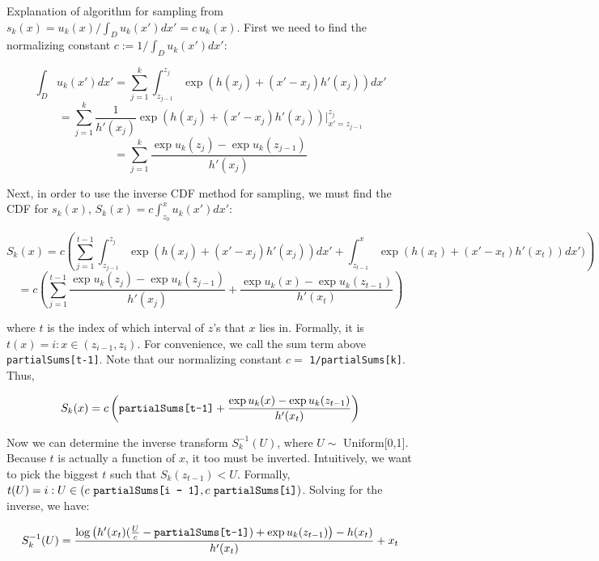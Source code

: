 \documentclass{article}
\begin{document}
Explanation of algorithm for sampling from $s_k(x) = u_k(x) / \int_D u_k(x') dx' = c \ u_k(x)$. First we need to find the normalizing constant $c := 1 / \int_D u_k(x') dx':$

$$
\int_D u_k(x') dx' = \sum_{j = 1}^k \int_{z_{j-1}}^{z_j} \exp(h(x_j) + (x' - x_j) h'(x_j)) dx'
$$
$$
 = \sum_{j = 1}^k \frac{1}{h'(x_j)} \exp(h(x_j) + (x' - x_j) h'(x_j)) \bigg\rvert^{z_j}_{x' = z_{j - 1}}
$$
$$
 = \sum_{j = 1}^k \frac{\exp u_k(z_j)  - \exp u_k(z_{j-1}) }{h'(x_j)}
$$

Next, in order to use the inverse CDF method for sampling, we must find the CDF for $s_k(x)$, $S_k(x) = c \int_{z_0}^x u_k(x') dx'$:

$$
S_k(x) = c \left(\sum_{j = 1}^{t - 1} \int_{z_{j-1}}^{z_j} \exp(h(x_j) + (x' - x_j) h'(x_j)) dx' + \int_{z_{t-1}}^x \exp(h(x_t) + (x' - x_t) h'(x_t)) dx') \right)
$$
$$
 = c \left( \sum_{j = 1}^{t-1} \frac{\exp u_k(z_j) - \exp u_k(z_{j-1})}{h'(x_j)} + \frac{\exp u_k(x) - \exp u_k(z_{t-1})}{h'(x_t)} \right)
$$

\noindent where $t$ is the index of which interval of $z$'s that $x$ lies in. Formally, it is $t(x) = i : x \in (z_{i-1}, z_i)$. For convenience, we call the sum term above \texttt{partialSums[t-1]}. Note that our normalizing constant $c =$ \texttt{1/partialSums[k]}. Thus,

$$
S_k(x) = c \left(\text{\texttt{partialSums[t-1]}} + \frac{\exp u_k(x) - \exp u_k(z_{t-1})}{h'(x_t)} \right)
$$

Now we can determine the inverse transform $S_k^{-1}(U)$, where $U \sim$ Uniform[0,1]. Because $t$ is actually a function of $x$, it too must be inverted. Intuitively, we want to pick the biggest $t$ such that $S_k(z_{t-1}) < U$. Formally, $t(U) = i : U \in (c\ \text{\texttt{partialSums[i - 1]}}, c\ \text{\texttt{partialSums[i]}})$. Solving for the inverse, we have:

$$
S_k^{-1}(U) = \frac{\log\left(h'(x_t) (\frac{U}{c} - \text{\texttt{partialSums[t-1]}}) + \exp u_k(z_{t-1})\right) - h(x_t)}{h'(x_t)} + x_t
$$
\end{document}
